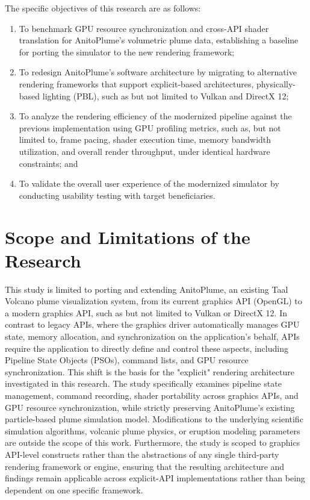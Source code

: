 The specific objectives of this research are as follows:
\begin{enumerate}
   \item To benchmark GPU resource synchronization and cross-API shader translation for AnitoPlume's volumetric plume data, establishing a baseline for porting the simulator to the new rendering framework;
   \item To redesign AnitoPlume's software architecture by migrating to alternative rendering frameworks that support explicit-based architectures, physically-based lighting (PBL), such as but not limited to Vulkan and DirectX 12;
   \item To analyze the rendering efficiency of the modernized pipeline against the previous implementation using GPU profiling metrics, such as, but not limited to, frame pacing, shader execution time, memory bandwidth utilization, and overall render throughput, under identical hardware constraints; and
   \item To validate the overall user experience of the modernized simulator by conducting usability testing with target beneficiaries.
\end{enumerate}



\section{Scope and Limitations of the Research}
\label{sec:scopelimitations}
This study is limited to porting and extending AnitoPlume, an existing Taal Volcano plume visualization system, from its current graphics API (OpenGL) to a modern graphics API, such as but not limited to Vulkan or DirectX 12. In contrast to legacy APIs, where the graphics driver automatically manages GPU state, memory allocation, and synchronization on the application's behalf, APIs require the application to directly define and control these aspects, including Pipeline State Objects (PSOs), command lists, and GPU resource synchronization. This shift is the basis for the "explicit" rendering architecture investigated in this research. The study specifically examines pipeline state management, command recording, shader portability across graphics APIs, and GPU resource synchronization, while strictly preserving AnitoPlume's existing particle-based plume simulation model. Modifications to the underlying scientific simulation algorithms, volcanic plume physics, or eruption modeling parameters are outside the scope of this work. Furthermore, the study is scoped to graphics API-level constructs rather than the abstractions of any single third-party rendering framework or engine, ensuring that the resulting architecture and findings remain applicable across explicit-API implementations rather than being dependent on one specific framework.

